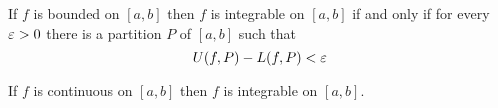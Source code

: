 \begin{theorem*}
  If $f$ is bounded on $[a, b]$ then $f$ is integrable on $[a, b]$ if and only if for every $\varepsilon > 0$ there is a partition $P$ of $[a, b]$ such that
  \[ U(f, P) - L(f, P) < \varepsilon \]
\end{theorem*}

\begin{theorem*}
  If $f$ is continuous on $[a, b]$ then $f$ is integrable on $[a, b]$.
\end{theorem*}

